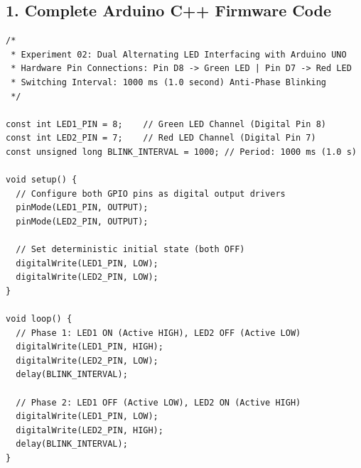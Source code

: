 \documentclass[10pt,a4paper]{article}
\begin{document}
\subsection*{1. Complete Arduino C++ Firmware Code}
\begin{lstlisting}[style=bwArduinoPrintLarge, title={\textbf{Program Listing 2.1: Complete Arduino C++ Program for Dual Alternating LED Blinking}}]
/*
 * Experiment 02: Dual Alternating LED Interfacing with Arduino UNO
 * Hardware Pin Connections: Pin D8 -> Green LED | Pin D7 -> Red LED
 * Switching Interval: 1000 ms (1.0 second) Anti-Phase Blinking
 */

const int LED1_PIN = 8;    // Green LED Channel (Digital Pin 8)
const int LED2_PIN = 7;    // Red LED Channel (Digital Pin 7)
const unsigned long BLINK_INTERVAL = 1000; // Period: 1000 ms (1.0 s)

void setup() {
  // Configure both GPIO pins as digital output drivers
  pinMode(LED1_PIN, OUTPUT);
  pinMode(LED2_PIN, OUTPUT);
  
  // Set deterministic initial state (both OFF)
  digitalWrite(LED1_PIN, LOW);
  digitalWrite(LED2_PIN, LOW);
}

void loop() {
  // Phase 1: LED1 ON (Active HIGH), LED2 OFF (Active LOW)
  digitalWrite(LED1_PIN, HIGH);
  digitalWrite(LED2_PIN, LOW);
  delay(BLINK_INTERVAL);
  
  // Phase 2: LED1 OFF (Active LOW), LED2 ON (Active HIGH)
  digitalWrite(LED1_PIN, LOW);
  digitalWrite(LED2_PIN, HIGH);
  delay(BLINK_INTERVAL);
}
\end{lstlisting}

\vspace{0.1cm}
\end{document}
